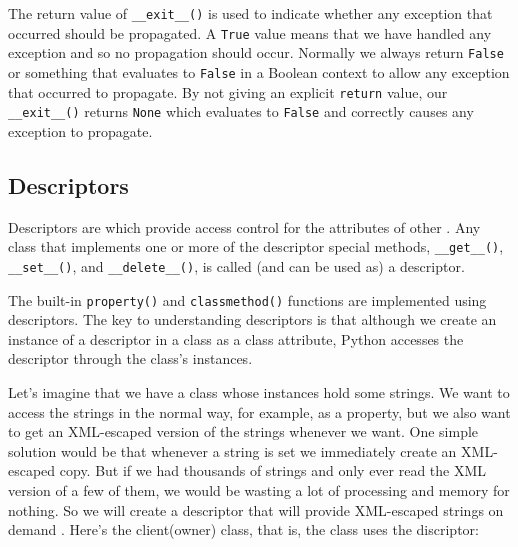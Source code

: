 The return value of \verb|__exit__()| is used to indicate whether any exception that occurred should be propagated.
A \verb|True| value means that we have handled any exception and so no propagation should occur.
Normally we always return \verb|False| or something that evaluates to \verb|False| in a Boolean context to allow any exception that occurred to propagate.
By not giving an explicit \verb|return| value, our \verb|__exit__()| returns \verb|None| which evaluates to \verb|False| and correctly causes any exception to propagate.



\subsection{Descriptors}

Descriptors are  which provide access control for the attributes of other .
Any class that implements one or more of the descriptor special methods, \verb|__get__()|, \verb|__set__()|, and \verb|__delete__()|, is called (and can be used as) a descriptor.


The built-in \verb|property()| and \verb|classmethod()| functions are implemented using descriptors.
The key to understanding descriptors is that although we create an instance of a descriptor in a class as a class attribute, Python accesses the descriptor through the class's instances.



Let’s imagine that we have a class whose instances hold some strings.
We want to access the strings in the normal way, for example, as a property, but we also want to get an XML-escaped version of the strings whenever we want.
One simple solution would be that whenever a string is set we immediately create an XML-escaped copy.
But if we had thousands of strings and only ever read the XML version of a few of them, we would be wasting a lot of processing and memory for nothing.
So we will create a descriptor that will provide XML-escaped strings on demand .
Here's the client(owner) class, that is, the class uses the discriptor:


